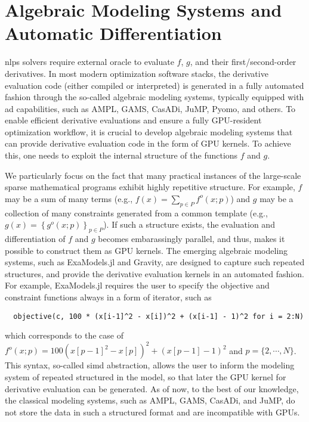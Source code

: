 \documentclass{article}
\begin{document}
\section{Algebraic Modeling Systems and Automatic Differentiation}\label{eqn:ad}
\Glspl*{nlp} solvers require external oracle to  evaluate $f$, $g$, and their first/second-order derivatives.
In most modern optimization software stacks, the derivative evaluation code (either compiled or interpreted) is generated in a fully automated fashion through the so-called algebraic modeling systems, typically equipped with \gls*{ad} capabilities, such as AMPL, GAMS, CasADi, JuMP, Pyomo, and others.
To enable efficient derivative evaluations and ensure a fully GPU-resident optimization workflow, it is crucial to develop algebraic modeling systems that can provide derivative evaluation code in the form of GPU kernels.
To achieve this, one needs to exploit the internal structure of the functions $f$ and $g$.

We particularly focus on the fact that many practical instances of the large-scale sparse mathematical programs exhibit highly repetitive structure.
For example, $f$ may be a sum of many terms (e.g., $f(x) = \sum_{p\in P} f^o(x; p)$) and $g$ may be a collection of many constraints generated from a common template (e.g., $g(x) = \left\{g^o(x; p)\right\}_{p\in P}$).
If such a structure exists, the evaluation and differentiation of $f$ and $g$ becomes embarassingly parallel, and thus, makes it possible to construct them as GPU kernels.
The emerging algebraic modeling systems, such as ExaModels.jl and Gravity, are designed to capture such repeated structures, and provide the derivative evaluation kernels in an automated fashion.
For example, ExaModels.jl requires the user to specify the objective and constraint functions always in a form of iterator, such as
\begin{lstlisting}
  objective(c, 100 * (x[i-1]^2 - x[i])^2 + (x[i-1] - 1)^2 for i = 2:N)
\end{lstlisting}
which corresponds to the case of $f^o(x; p) = 100(x[p-1]^2 - x[p])^2 + (x[p-1]-1)^2$ and $p=\{2,\cdots,N\}$.
This syntax, so-called \gls*{simd} abstraction, allows the user to inform the modeling system of repeated structured in the model, so that later the GPU kernel for derivative evaluation can be generated.
As of now, to the best of our knowledge, the classical modeling systems, such as AMPL, GAMS, CasADi, and JuMP, do not store the data in such a structured format and are incompatible with GPUs.
\end{document}
